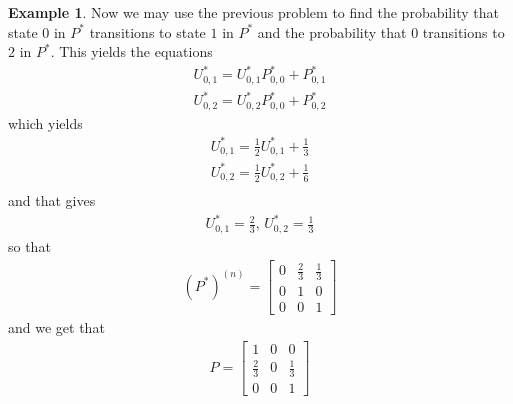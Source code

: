\documentclass[11pt]{amsart}
\theoremstyle{definition}
\newtheorem{example}[theorem]{Example}
\numberwithin{equation}{section}
\begin{document}
\begin{example}
     Now we may use the previous problem to find the probability that state $0$ in $P^*$ transitions to state $1$ in $P^*$ and the probability that $0 $ transitions to $2$ in $P^*$. This yields the equations
     \begin{align*}
         U^*_{0,1}=U^*_{0,1}P^*_{0,0}+P^*_{0,1}\\
         U^*_{0,2}=U^*_{0,2}P^*_{0,0}+P^*_{0,2}
     \end{align*}
     which yields
     \begin{align*}
         U_{0,1}^*=\frac{1}{2}U_{0,1}^*+\frac{1}{3}\\
         U_{0,2}^*=\frac{1}{2}U_{0,2}^*+\frac{1}{6}\\
     \end{align*}
     and that gives
     \begin{align*}
         U_{0,1}^*=\frac{2}{3},\,U_{0,2}^*=\frac{1}{3}
     \end{align*}
     so that \begin{align*}(P^*)^{(n)}=\begin{bmatrix}
         0 & \frac{2}{3} & \frac{1}{3}\\
         0 & 1 & 0\\
         0 & 0 & 1
     \end{bmatrix}\end{align*}
     and we get that
     \begin{align*}
         P=\begin{bmatrix}
             1 & 0 & 0\\
             \frac{2}{3} & 0 & \frac{1}{3}\\
             0 & 0 & 1
         \end{bmatrix}
     \end{align*}
 \end{example}
\end{document}
